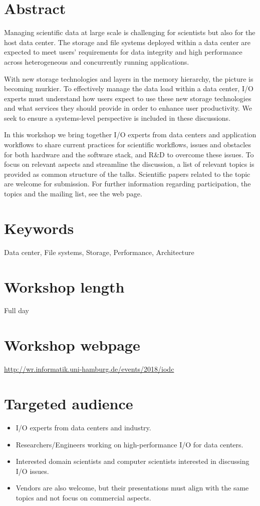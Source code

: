 \documentclass[a4paper,10pt]{article}
\begin{document}
\section{Abstract}
Managing scientific data at large scale is challenging for scientists but also for the host data center.
The storage and file systems deployed within a data center are expected to meet users' requirements for data integrity and high performance across heterogeneous and concurrently running applications.

With new storage technologies and layers in the memory hierarchy, the picture is becoming murkier.
To effectively manage the data load within a data center, I/O experts must understand how users expect to use these new storage technologies and what services they should provide in order to enhance user productivity. We seek to ensure a systems-level perspective is included in these discussions.

In this workshop we bring together I/O experts from data centers and application workflows to share current practices for scientific workflows, issues and obstacles for both hardware and the software stack, and R\&D to overcome these issues.
To focus on relevant aspects and streamline the discussion, a list of relevant topics is provided as common structure of the talks.
Scientific papers related to the topic are welcome for submission.
For further information regarding participation, the topics and the mailing list, see the web page.

\section{Keywords}
Data center, File systems, Storage, Performance, Architecture

\section{Workshop length}
Full day %

\section{Workshop webpage}
\url{http://wr.informatik.uni-hamburg.de/events/2018/iodc}


\section{Targeted audience}
\begin{itemize}
\item I/O experts from data centers and industry.
\item Researchers/Engineers working on high-performance I/O for data centers.
\item Interested domain scientists and computer scientists interested in discussing I/O issues.
\item Vendors are also welcome, but their presentations must align with the same topics and not focus on commercial aspects.
\end{itemize}
\end{document}
